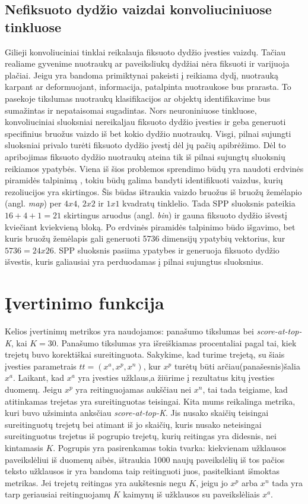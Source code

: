 \documentclass{VUMIFPSkursinis}
\DeclareRobustCommand{\[}{\begin{equation}}
\DeclareRobustCommand{\]}{\end{equation}}
\begin{document}
\subsection{Nefiksuoto dydžio vaizdai konvoliuciniuose tinkluose}
Gilieji konvoliuciniai tinklai reikalauja fiksuoto dydžio įvesties vaizdų. Tačiau realiame gyvenime nuotraukų ar paveiksliukų dydžiai nėra fiksuoti ir varijuoja plačiai.
\newline
Jeigu yra bandoma primiktynai pakeisti į reikiama dydį, nuotrauką karpant ar deformuojant, informacija, patalpinta nuotraukose bus prarasta. To pasekoje tikslumas nuotraukų klasifikacijos ar objektų identifikavime bus sumažintas ir nepataisomai sugadintas. Nors neuroniniuose tinkluose, konvoliuciniai sluoksniai nereikaljau fiksuoto dydžio įvesties ir geba generuoti specifinius bruožus vaizdo iš bet kokio dydžio nuotraukų. Visgi, pilnai sujungti sluoksniai privalo turėti fiksuoto dydžio įvestį dėl jų pačių apibrėžimo. Dėl to apribojimas fiksuoto dydžio nuotraukų ateina tik iš pilnai sujungtų sluoksnių reikiamos ypatybės.
Viena iš šios problemos sprendimo būdų yra naudoti erdvinės piramidės talpinimą \cite{Spatial_pyramid_pooling}, tokiu būdų galima bandyti identifikuoti vaizdus, kurių rezoliucijos yra skirtingos.
\newline
Šis būdas ištraukia vaizdo bruožus iš bruožų žemėlapio (angl. \textit{map}) per $4 x 4$, $2 x 2$ ir $1 x 1$ kvadratų tinklelio. Tada SPP sluoksnis pateikia $16 + 4 + 1 = 21$ skirtingus aruodus (angl. \textit{bin}) ir gauna fiksuoto dydžio išvestį kviečiant kviekvieną bloką. Po erdvinės piramidės talpinimo būdo išgavimo, bet kuris bruožų žemėlapis gali generuoti 5736 dimensijų ypatybių vektorius, kur $5736 = 24 x 26$. SPP sluoksnis pasiima ypatybes ir generuoja  fiksuoto dydžio išvestis, kuris galiausiai yra perduodamas į pilnai sujungtus sluoksnius.
\pagebreak

\section{Įvertinimo funkcija}
Kelios įvertinimų metrikos yra naudojamos: panašumo tikslumas bei \emph{score-at-top-K}, kai $K = 30$. Panašumo tikslumas yra išreiškiamas procentaliai pagal tai, kiek trejetų buvo korektiškai sureitinguota. Sakykime, kad turime trejetą, su šiais įvesties parametrais $tt = (x^a, x^p, x^n)$, kur $x^p$ turėtų būti arčiau(panašesnis)šalia $x^a$. Laikant, kad $x^a$ yra įvesties užklaus,a žiūrime į rezultatus kitų įvesties duomenų. Jeigu $x^p$ yra reitinguojamas aukščiau nei $x^n$, tai tada teigiame, kad atitinkamas trejetas yra sureitinguotas teisingai. Kita mums reikalinga metrika, kuri buvo užsiminta anksčiau \emph{score-at-top-K}. Jis nusako skaičių teisingai sureitinguotų trejetų bei atimant iš jo skaičių, kuris nusako neteisingai sureitinguotus trejetus iš pogrupio trejetų, kurių reitingas yra didesnis, nei kintamasis $K$. Pogrupis yra pasirenkamas tokia tvarka: kiekvienam užklausos paveikslėliui iš duomenų aibės, ištraukia 1000 naujų paveikslėlių iš tos pačios teksto užklausos ir yra bandoma taip reitinguoti juos, pasitelkiant išmoktas metrikas. Jei trejetų reitingas yra aukštesnis negu $K$, jeigu jo $x^p$ arba $x^n$ tada yra tarp geriausiai reitinguojamų $K$ kaimynų iš užklausos su paveikslėliais $x^a$.
\pagebreak
\end{document}
